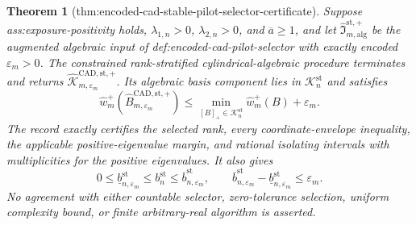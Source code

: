 \documentclass{article}
\newtheorem{theorem}{Theorem}
\begin{document}
\begin{theorem}[thm:encoded-cad-stable-pilot-selector-certificate]\label{thm:encoded-cad-stable-pilot-selector-certificate}
Suppose ass:exposure-positivity holds, \(\lambda_{1,n}>0\), \(\lambda_{2,n}>0\), and \(\overline a\ge1\), and let \(\widehat{\mathfrak I}_{m,\mathrm{alg}}^{\mathrm{st},+}\) be the augmented algebraic input of def:encoded-cad-pilot-selector with exactly encoded \(\varepsilon_m>0\).  The constrained rank-stratified cylindrical-algebraic procedure terminates and returns \(\widehat{\mathscr K}_{m,\varepsilon_m}^{\mathrm{CAD,st},+}\).  Its algebraic basis component lies in \(\mathcal K_n^{\mathrm{st}}\) and satisfies
\[
\widehat w_m^+(\widehat B_{m,\varepsilon_m}^{\mathrm{CAD,st},+})
\le
\min_{[B]_+\in\mathcal K_n^{\mathrm{st}}}\widehat w_m^+(B)+\varepsilon_m.
\]
The record exactly certifies the selected rank, every coordinate-envelope inequality, the applicable positive-eigenvalue margin, and rational isolating intervals with multiplicities for the positive eigenvalues.  It also gives
\[
0\le\underline b_{n,\varepsilon_m}^{\mathrm{st}}
\le b_n^{\mathrm{st}}
\le\overline b_{n,\varepsilon_m}^{\mathrm{st}},
\qquad
\overline b_{n,\varepsilon_m}^{\mathrm{st}}
-\underline b_{n,\varepsilon_m}^{\mathrm{st}}
\le\varepsilon_m.
\]
No agreement with either countable selector, zero-tolerance selection, uniform complexity bound, or finite arbitrary-real algorithm is asserted.
\end{theorem}
\end{document}
